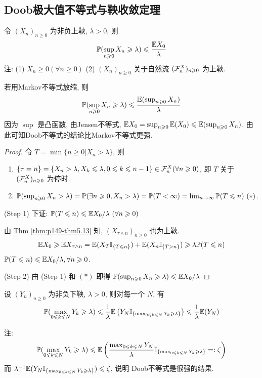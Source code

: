 \subsection{Doob极大值不等式与鞅收敛定理}

\begin{theorem}[Doob极大值不等式]
    令 $(X_n)_{n\geq 0}$ 为非负上鞅, $\lambda>0$, 则
    \[
    \mathbb{P}(\sup_{n\geqslant 0} X_n\geqslant \lambda)\leqslant \frac{\mathbb E X_0}{\lambda}
    \]
    注: (1) $X_n\geq 0 (\forall n\geq 0)$ (2) $(X_n)_{n\geq 0}$ 关于自然流 $(\mathcal{F}_n^X)_{n\geqslant 0}$ 为上鞅.
\end{theorem}

若用Markov不等式放缩, 则
\[
\mathbb{P}(\sup_{n\geqslant 0} X_n\geqslant \lambda)\leqslant \frac{\mathbb E (\sup_{n\geqslant 0} X_n)}{\lambda}
\]
因为 $\sup$ 是凸函数, 由Jensen不等式, $\mathbb E X_0=\sup_{n\geqslant 0}\mathbb E(X_0)\leqslant \mathbb E(\sup_{n\geqslant 0} X_n)$. 由此可知Doob不等式的结论比Markov不等式更强.

\begin{proof}
    令 $T=\min\{n\geq 0|X_n>\lambda\}$, 则
    \begin{enumerate}
        \item $\{\tau=n\}=\{X_n>\lambda, X_k\leqslant \lambda,0\leqslant k\leqslant n-1\}\in\mathcal{F}_n^X (\forall n\geqslant 0)$, 即 $T$ 关于 $(\mathcal{F}_n^X)_{n\geqslant 0}$ 为停时.
        \item $\PP(\sup_{n\geq 0}X_n>\lambda)=\PP(\exists n\geq 0, X_n>\lambda)=\PP(T<\infty)=\limit{n}\PP(T\leq n)\ (*)$. 
    \end{enumerate}
    (Step 1) 下证: $\mathbb{P}(T\leqslant n)\leqslant \mathbb E X_0/\lambda \ (\forall n\geqslant 0)$

    由 Thm \ref{thm:p149-thm5.13} 知, $(X_{\tau\land n})_{n\geq 0}$ 也为上鞅.
    \[
    \mathbb E X_0 \geqslant \mathbb E X_{\tau\land n}=\mathbb E (X_T\mathbb I_{\{T\leqslant n\}})+\mathbb E(X_n\mathbb I_{\{T>n\}})\geqslant \lambda \mathbb{P}(T\leqslant n)
    \]
    $\mathbb{P}(T\leqslant n)\leqslant \mathbb E X_0/\lambda, \forall n\geqslant 0$.

    (Step 2) 由 (Step 1) 和 $(*)$ 即得 $\mathbb{P}(\sup_{n\geqslant 0} X_n\geqslant \lambda)\leqslant \mathbb E X_0/\lambda$
\end{proof}

\begin{theorem}[下鞅的Doob极大值不等式]
    设 $(Y_n)_{n\geq 0}$ 为非负下鞅, $\lambda>0$, 则对每一个 $N$, 有
    \[
    \mathbb{P}(\max_{0\leqslant k\leqslant N}Y_k\geqslant \lambda)\leqslant \frac{1}{\lambda}\mathbb E\left(
        Y_N\mathbb I_{\{\max_{0\leqslant k\leqslant N}Y_k\geqslant \lambda\}}
    \right)\leqslant \frac{1}{\lambda}\mathbb E (Y_N)
    \]
\end{theorem}

注:
\[
\mathbb{P}(\max_{0\leqslant k\leqslant N}Y_k\geqslant \lambda)\leqslant \mathbb E\left(
    \frac{\max_{0\leqslant k\leqslant N}Y_N}{\lambda}\mathbb I_{\{\max_{0\leqslant k\leqslant N}Y_k\geqslant \lambda\}}=:\zeta
\right)
\]
而 $\lambda^{-1}\mathbb E(Y_N\mathbb I_{\{\max_{0\leqslant k\leqslant N}Y_k\geqslant \lambda\}})\leqslant \zeta$, 说明 Doob不等式是很强的结果.

